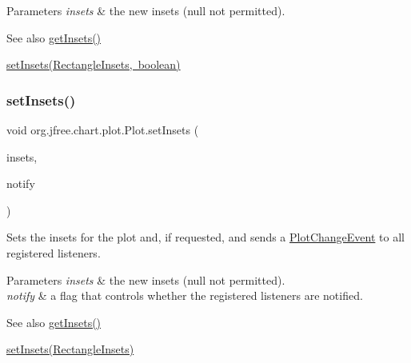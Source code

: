 \begin{DoxyParams}{Parameters}
{\em insets} & the new insets ({\ttfamily null} not permitted).\\
\hline
\end{DoxyParams}
\begin{DoxySeeAlso}{See also}
\mbox{\hyperlink{classorg_1_1jfree_1_1chart_1_1plot_1_1_plot_a8c217375afeb9eae164af090797aacf1}{get\+Insets()}} 

\mbox{\hyperlink{classorg_1_1jfree_1_1chart_1_1plot_1_1_plot_a091b3d587405d49a6637c67b9b68d767}{set\+Insets(\+Rectangle\+Insets, boolean)}} 
\end{DoxySeeAlso}
\mbox{\label{classorg_1_1jfree_1_1chart_1_1plot_1_1_plot_a091b3d587405d49a6637c67b9b68d767}} 
\subsubsection{\texorpdfstring{set\+Insets()}{setInsets()}\hspace{0.1cm}{\footnotesize\ttfamily [2/2]}}
{\footnotesize\ttfamily void org.\+jfree.\+chart.\+plot.\+Plot.\+set\+Insets (\begin{DoxyParamCaption}\item[{Rectangle\+Insets}]{insets,  }\item[{boolean}]{notify }\end{DoxyParamCaption})}

Sets the insets for the plot and, if requested, and sends a \mbox{\hyperlink{}{Plot\+Change\+Event}} to all registered listeners.


\begin{DoxyParams}{Parameters}
{\em insets} & the new insets ({\ttfamily null} not permitted). \\
\hline
{\em notify} & a flag that controls whether the registered listeners are notified.\\
\hline
\end{DoxyParams}
\begin{DoxySeeAlso}{See also}
\mbox{\hyperlink{classorg_1_1jfree_1_1chart_1_1plot_1_1_plot_a8c217375afeb9eae164af090797aacf1}{get\+Insets()}} 

\mbox{\hyperlink{classorg_1_1jfree_1_1chart_1_1plot_1_1_plot_a53965b8c7aa0ea6215a2f37447112ba5}{set\+Insets(\+Rectangle\+Insets)}} 
\end{DoxySeeAlso}
\mbox{\label{classorg_1_1jfree_1_1chart_1_1plot_1_1_plot_aee0433130592a26f29833dd91a3bc7a1}} 
